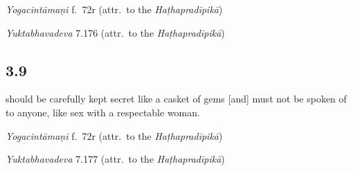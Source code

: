 \begin{ekdosis}
\begin{sources}[hp03_008]
\end{sources}

\begin{testimonia}[hp03_008]
\emph{Yogacintāmaṇi} f.~72r (attr.~to the \emph{Haṭhapradīpikā})
\begin{versinnote}
\end{versinnote}

\emph{Yuktabhavadeva} 7.176 (attr.~to the \emph{Haṭhapradīpikā})
\begin{versinnote}
\end{versinnote}
\end{testimonia}


\subsection*{3.9}
\begin{translation}[hp03_009]
[\ldots] should be carefully kept secret like a casket of gems [and] must not be spoken of to anyone, like sex with a respectable woman.
\end{translation}

\begin{sources}[hp03_009]
\end{sources}

\begin{testimonia}[hp03_009]
\emph{Yogacintāmaṇi} f.~72r (attr.~to the \emph{Haṭhapradīpikā})
\begin{versinnote}
\end{versinnote}

\emph{Yuktabhavadeva} 7.177 (attr.~to the \emph{Haṭhapradīpikā})
\begin{versinnote}
\end{versinnote}
\end{testimonia}


\end{ekdosis}
